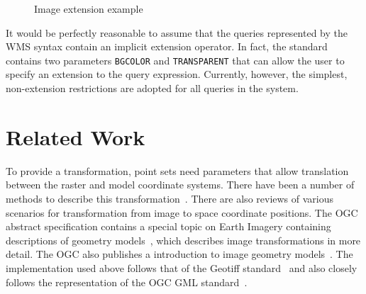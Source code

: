\documentclass{ucdthesis}       %
\begin{document}
\begin{figure}[htb]
  \centering
  {
    \caption{Image extension example}
    \label{fig:extension2}
  }
\end{figure} 

It would be perfectly reasonable to assume that the queries
represented by the \ac{WMS} syntax contain an implicit extension
operator.  In fact, the standard contains two parameters
\texttt{BGCOLOR} and \texttt{TRANSPARENT} that can allow the user to
specify an extension to the query expression.  Currently, however, the
simplest, non-extension restrictions are adopted for all queries in
the system.

\section{Related Work}

To provide a transformation, point sets need parameters that allow
translation between the raster and model coordinate systems.  There
have been a number of methods to describe this
transformation~\cite{openg01openg-implem, perciv04earth-imager,
  ritter00geotif-format, warmer04gdal-data}.  There are also reviews
of various scenarios for transformation from image to space coordinate
positions.  The \ac{OGC} abstract specification contains a special
topic on Earth Imagery containing descriptions of geometry
models~\cite{perciv04earth-imager}, which describes image
transformations in more detail.  The \ac{OGC} also publishes a
introduction to image geometry models~\cite{whites04some}.  The
implementation used above follows that of the Geotiff
standard~\cite{ritter00geotif-format} and also closely follows the
representation of the \ac{OGC} \ac{GML}
standard~\cite{cox03geogr-markup, whites01defin-data,
  whites05recom-xml}.
\end{document}
